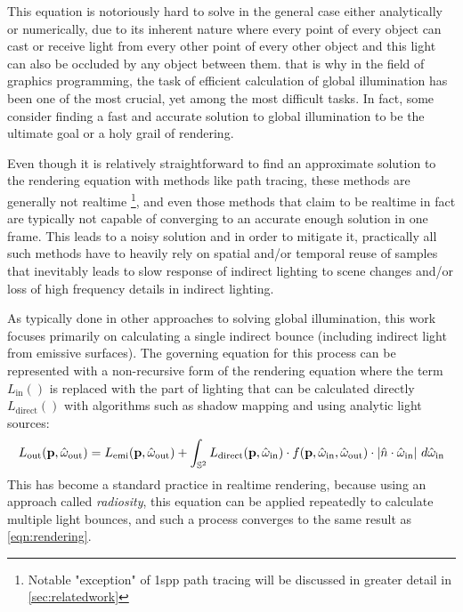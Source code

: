 \documentclass{jcgt}
\begin{document}
This equation is notoriously hard to solve in the general case either analytically or numerically, due to its inherent nature where every point of every object can cast or receive light from every other point of every other object and this light can also be occluded by any object between them. that is why in the field of graphics programming, the task of efficient calculation of global illumination has been one of the most crucial, yet among the most difficult tasks. In fact, some consider finding a fast and accurate solution to global illumination to be the ultimate goal or a holy grail of rendering.

Even though it is relatively straightforward to find an approximate solution to the rendering equation with methods like path tracing, these methods are generally not realtime \footnote{Notable "exception" of 1spp path tracing will be discussed in greater detail in \ref{sec:relatedwork}}, and even those methods that claim to be realtime in fact are typically not capable of converging to an accurate enough solution in one frame. This leads to a noisy solution and in order to mitigate it, practically all such methods have to heavily rely on spatial and/or temporal reuse of samples that inevitably leads to slow response of indirect lighting to scene changes and/or loss of high frequency details in indirect lighting.

As typically done in other approaches to solving global illumination, this work focuses primarily on calculating a single indirect bounce (including indirect light from emissive surfaces). The governing equation for this process can be represented with a non-recursive form of the rendering equation where the term $L_\mathrm{in}()$ is replaced with the part of lighting that can be calculated directly $L_\mathrm{direct}()$ with algorithms such as shadow mapping and using analytic light sources:
\begin{equation}
  L_\mathrm{out}(\textbf{p}, \hat \omega_\mathrm{out}) = L_\mathrm{emi}(\textbf{p}, \hat \omega_\mathrm{out}) + \int_{\mathbb{S}^2} L_\mathrm{direct}(\textbf{p}, \hat \omega_\mathrm{in}) \cdot f(\textbf p, \hat \omega_\mathrm{in}, \hat{\omega}_\mathrm{out}) \cdot |\hat{n} \cdot \hat{\omega}_\mathrm{in} |~ d\hat{\omega}_\mathrm{in}
  \label{eqn:reduced_rendering}
\end{equation}
This has become a standard practice in realtime rendering, because using an approach called \emph{radiosity}, this equation can be applied repeatedly to calculate multiple light bounces, and such a process converges to the same result as \ref{eqn:rendering}.
\end{document}
